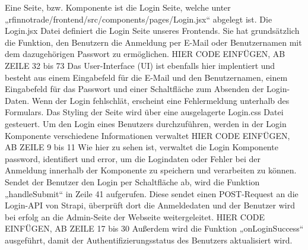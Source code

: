 Eine Seite, bzw. Komponente ist die Login Seite, welche unter „rfinnotrade/frontend/src/components/pages/Login.jsx“ abgelegt ist.
Die Login.jsx Datei definiert die Login Seite unseres Frontends. Sie hat grundsätzlich die Funktion, den Benutzern die Anmeldung per E-Mail oder Benutzernamen mit dem dazugehörigen Passwort zu ermöglichen.
HIER CODE EINFÜGEN, AB ZEILE 32 bis 73
Das User-Interface (UI) ist ebenfalls hier implentiert und besteht aus einem Eingabefeld für die E-Mail und den Benutzernamen, einem Eingabefeld für das Passwort und einer Schaltfläche zum Absenden der Login-Daten. Wenn der Login fehlschlät, erscheint eine Fehlermeldung unterhalb des Formulars.
Das Styling der Seite wird über eine ausgelagerte Login.css Datei gesteuert.
Um den Login eines Benutzers durchzuführen, werden in der Login Komponente verschiedene Informationen verwaltet
HIER CODE EINFÜGEN, AB ZEILE 9 bis 11 
Wie hier zu sehen ist, verwaltet die Login Komponente password, identifiert und error, um die Logindaten oder Fehler bei der Anmeldung innerhalb der Komponente zu speichern und verarbeiten zu können.
Sendet der Benutzer den Login per Schaltfläche ab, wird die Funktion „handleSubmit“ in Zeile 41 aufgerufen. Diese sendet einen POST-Request an die Login-API von Strapi, überprüft dort die Anmeldedaten und der Benutzer wird bei erfolg an die Admin-Seite der Webseite weitergeleitet.
HIER CODE EINFÜGEN, AB ZEILE 17 bis 30
Außerdem wird die Funktion „onLoginSuccess“ ausgeführt, damit der Authentifizierungsstatus des Benutzers aktualisiert wird.